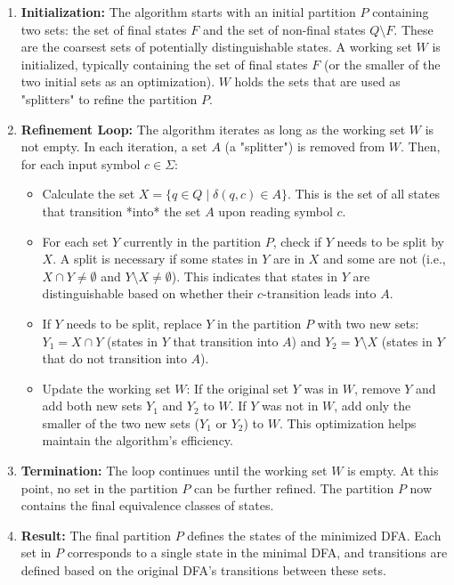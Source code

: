 \begin{enumerate}
    \item \textbf{Initialization:} The algorithm starts with an initial partition $P$ containing two sets: the set of final states $F$ and the set of non-final states $Q \setminus F$. These are the coarsest sets of potentially distinguishable states. A working set $W$ is initialized, typically containing the set of final states $F$ (or the smaller of the two initial sets as an optimization). $W$ holds the sets that are used as "splitters" to refine the partition $P$.

    \item \textbf{Refinement Loop:} The algorithm iterates as long as the working set $W$ is not empty. In each iteration, a set $A$ (a "splitter") is removed from $W$. Then, for each input symbol $c \in \Sigma$:
        \begin{itemize}
            \item Calculate the set $X = \{q \in Q \mid \delta(q, c) \in A\}$. This is the set of all states that transition *into* the set $A$ upon reading symbol $c$.
            \item For each set $Y$ currently in the partition $P$, check if $Y$ needs to be split by $X$. A split is necessary if some states in $Y$ are in $X$ and some are not (i.e., $X \cap Y \neq \emptyset$ and $Y \setminus X \neq \emptyset$). This indicates that states in $Y$ are distinguishable based on whether their $c$-transition leads into $A$.
            \item If $Y$ needs to be split, replace $Y$ in the partition $P$ with two new sets: $Y_1 = X \cap Y$ (states in $Y$ that transition into $A$) and $Y_2 = Y \setminus X$ (states in $Y$ that do not transition into $A$).
            \item Update the working set $W$: If the original set $Y$ was in $W$, remove $Y$ and add both new sets $Y_1$ and $Y_2$ to $W$. If $Y$ was not in $W$, add only the smaller of the two new sets ($Y_1$ or $Y_2$) to $W$. This optimization helps maintain the algorithm's efficiency.
        \end{itemize}

    \item \textbf{Termination:} The loop continues until the working set $W$ is empty. At this point, no set in the partition $P$ can be further refined. The partition $P$ now contains the final equivalence classes of states.

    \item \textbf{Result:} The final partition $P$ defines the states of the minimized DFA. Each set in $P$ corresponds to a single state in the minimal DFA, and transitions are defined based on the original DFA's transitions between these sets.
\end{enumerate}

